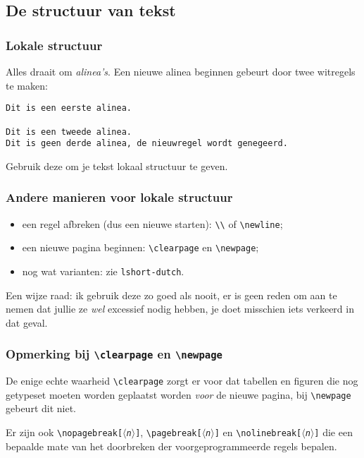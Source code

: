 \subsection{De structuur van tekst}
\begin{frame}[fragile]
  \frametitle{Lokale structuur}

  Alles draait om \emph{alinea's}. Een nieuwe alinea beginnen gebeurt door twee witregels te maken:

  \begin{verbatim}
Dit is een eerste alinea.

Dit is een tweede alinea.
Dit is geen derde alinea, de nieuwregel wordt genegeerd.
  \end{verbatim}

  Gebruik deze om je tekst lokaal structuur te geven.
\end{frame}

\begin{frame}
  \frametitle{Andere manieren voor lokale structuur}

  \begin{itemize}
    \item een regel afbreken (dus een nieuwe starten): \texttt{\textbackslash\textbackslash} of \texttt{\textcolor{uagreen}\textbackslash newline};
    \item een nieuwe pagina beginnen: \texttt{\textcolor{uagreen}{\textbackslash clearpage}} en \texttt{\textcolor{uagreen}{\textbackslash newpage}};
    \item nog wat varianten: zie \texttt{lshort-dutch}.
  \end{itemize}

  Een wijze raad: ik gebruik deze zo goed als nooit, er is geen reden om aan te nemen dat jullie ze \emph{wel} excessief nodig hebben, je doet misschien iets verkeerd in dat geval.
\end{frame}

\begin{frame}
  \frametitle{Opmerking bij \texttt{\textbackslash clearpage} en \texttt{\textbackslash newpage}}

  \begin{exampleblock}{De enige echte waarheid}
    \texttt{\textcolor{uagreen}{\textbackslash clearpage}} zorgt er voor dat tabellen en figuren die nog getypeset moeten worden geplaatst worden \emph{voor} de nieuwe pagina, bij \texttt{\textcolor{uagreen}{\textbackslash newpage}} gebeurt dit niet.
  \end{exampleblock}
  
  Er zijn ook \texttt{\textcolor{uagreen}{\textbackslash nopagebreak}[$\langle$\textsl{n}$\rangle$]}, \texttt{\textcolor{uagreen}{\textbackslash pagebreak}[$\langle$\textsl{n}$\rangle$]} en \texttt{\textcolor{uagreen}{\textbackslash nolinebreak}[$\langle$\textsl{n}$\rangle$]} die een bepaalde mate van het doorbreken der voorgeprogrammeerde regels bepalen.
\end{frame}

